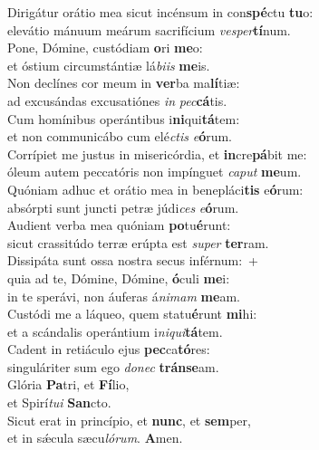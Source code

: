 \evenverse Dirigátur orátio mea sicut incénsum in con\textbf{spé}ctu \textbf{tu}o:~\*\\
\evenverse elevátio mánuum meárum sacrifícium \textit{ve}\textit{sper}\textbf{tí}num.\\
\oddverse Pone, Dómine, custódiam \textbf{o}ri \textbf{me}o:~\*\\
\oddverse et óstium circumstántiæ lá\textit{bi}\textit{is} \textbf{me}is.\\
\evenverse Non declínes cor meum in \textbf{ver}ba ma\textbf{lí}tiæ:~\*\\
\evenverse ad excusándas excusatiónes \textit{in} \textit{pec}\textbf{cá}tis.\\
\oddverse Cum homínibus operántibus i\textbf{ni}qui\textbf{tá}tem:~\*\\
\oddverse et non communicábo cum elé\textit{ctis} \textit{e}\textbf{ó}rum.\\
\evenverse Corrípiet me justus in misericórdia, et \textbf{in}cre\textbf{pá}bit me:~\*\\
\evenverse óleum autem peccatóris non impínguet \textit{ca}\textit{put} \textbf{me}um.\\
\oddverse Quóniam adhuc et orátio mea in benepláci\textbf{tis} e\textbf{ó}rum:~\*\\
\oddverse absórpti sunt juncti petræ júdi\textit{ces} \textit{e}\textbf{ó}rum.\\
\evenverse Audient verba mea quóniam \textbf{po}tu\textbf{é}runt:~\*\\
\evenverse sicut crassitúdo terræ erúpta est \textit{su}\textit{per} \textbf{ter}ram.\\
\oddverse Dissipáta sunt ossa nostra secus inférnum:~+\\
\oddverse  quia ad te, Dómine, Dómine, \textbf{ó}culi \textbf{me}i:~\*\\
\oddverse in te sperávi, non áuferas á\textit{ni}\textit{mam} \textbf{me}am.\\
\evenverse Custódi me a láqueo, quem statu\textbf{é}runt \textbf{mi}hi:~\*\\
\evenverse et a scándalis operántium i\textit{ni}\textit{qui}\textbf{tá}tem.\\
\oddverse Cadent in retiáculo ejus \textbf{pec}ca\textbf{tó}res:~\*\\
\oddverse singuláriter sum ego \textit{do}\textit{nec} \textbf{trán}\textbf{se}am.\\
\evenverse Glória \textbf{Pa}tri, et \textbf{Fí}lio,~\*\\
\evenverse et Spirí\textit{tu}\textit{i} \textbf{San}cto.\\
\oddverse Sicut erat in princípio, et \textbf{nunc}, et \textbf{sem}per,~\*\\
\oddverse et in sǽcula sæcu\textit{ló}\textit{rum}. \textbf{A}men.\\
